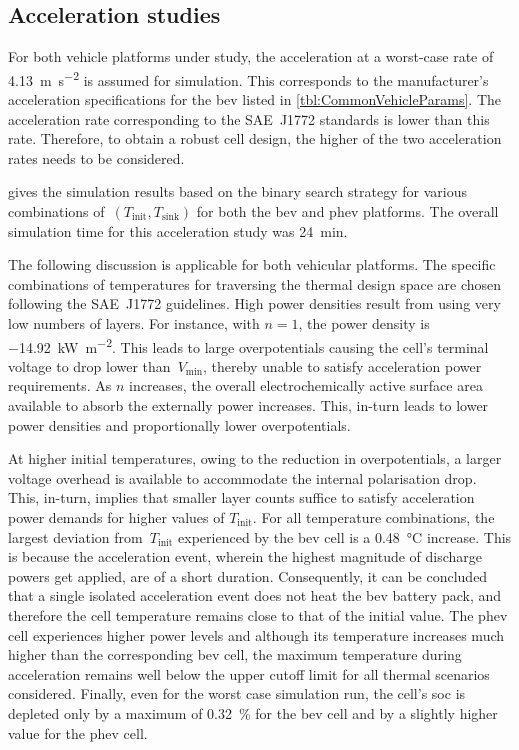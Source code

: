 \subsection{Acceleration studies}

For both vehicle platforms under study, the acceleration at a worst-case rate of
\SI{4.13}{\meter\per\second\squared} is assumed for simulation. This corresponds
to the  manufacturer's acceleration specifications  for the \gls{bev}  listed in
\cref{tbl:CommonVehicleParams}.  The  acceleration  rate  corresponding  to  the
SAE~J1772 standards is lower than this  rate. Therefore, to obtain a robust cell
design, the higher of the two acceleration rates needs to be considered.

  gives the  simulation  results  based on the binary
search strategy for various  combinations of~${(T_\text{init},  T_\text{sink})}$
for  both the  \gls{bev}  and  \gls{phev} platforms. The overall simulation time
for this acceleration study was \SI{24}{\minute}.



The following discussion is applicable for both vehicular platforms. The
specific combinations  of temperatures  for traversing  the thermal  design
space are  chosen following the  SAE~J1772 guidelines. High  power densities
result from  using very low numbers of layers. For instance, with $n=1$, the
power density is \SI{-14.92}{\kilo\watt\per\meter\squared}. This leads to large
overpotentials  causing the cell's terminal  voltage to  drop lower
than~$V_\text{min}$, thereby  unable to satisfy acceleration power requirements.
As $n$ increases, the overall electrochemically active surface area available to
absorb the externally power increases. This, in-turn leads to lower power
densities and proportionally lower overpotentials.

At higher initial temperatures, owing to the  reduction in  overpotentials, a
larger  voltage overhead  is available  to accommodate the  internal
polarisation  drop. This, in-turn, implies that smaller layer counts suffice to
satisfy acceleration power demands for higher values of $T_\text{init}$. For all
temperature combinations, the largest deviation from~$T_\text{init}$
experienced by the \gls{bev} cell is a \SI{0.48}{\degreeCelsius} increase. This
is because the acceleration event, wherein the highest magnitude of discharge
powers get applied, are of a  short duration. Consequently, it can be  concluded
that a single isolated acceleration event does not heat the \gls{bev} battery
pack, and therefore the cell  temperature remains close to that of  the initial
value. The \gls{phev} cell  experiences higher  power levels  and although  its
temperature increases  much  higher  than  the corresponding  \gls{bev}  cell,
the  maximum temperature  during acceleration  remains  well below  the  upper
cutoff  limit for all thermal scenarios considered. Finally, even  for the worst
case simulation  run, the cell's  \gls{soc} is depleted only by  a maximum of
\SI{0.32}{\percent} for  the \gls{bev} cell and by a slightly higher value for
the \gls{phev} cell.

